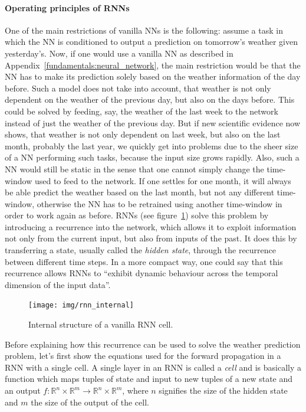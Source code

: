 \paragraph{Operating principles of RNNs}
One of the main restrictions of vanilla NNs is the following: assume a task in which the NN is conditioned to output a prediction on tomorrow's weather given yesterday's. Now, if one would use a vanilla NN as described in Appendix~\ref{fundamentals:neural_network}, the main restriction would be that the NN has to make its prediction solely based on the weather information of the day before. Such a model does not take into account, that weather is not only dependent on the weather of the previous day, but also on the days before. This could be solved by feeding, say, the weather of the last week to the network instead of just the weather of the previous day. But if new scientific evidence now shows, that weather is not only dependent on last week, but also on the last month, probably the last year, we quickly get into problems due to the sheer size of a NN performing such tasks, because the input size grows rapidly. Also, such a NN would still be static in the sense that one cannot simply change the time-window used to feed to the network. If one settles for one month, it will always be able predict the weather based on the last month, but not any different time-window, otherwise the NN has to be retrained using another time-window in order to work again as before. RNNs (see figure~\ref{fundamentals:rnn:internal_structure}) solve this problem by introducing a recurrence into the network, which allows it to exploit information not only from the current input, but also from inputs of the past. It does this by transferring a state, usually called the \emph{hidden state}, through the recurrence between different time steps. In a more compact way, one could say that this recurrence allows RNNs to ``exhibit dynamic behaviour across the temporal dimension of the input data''.

\begin{figure}[h]
	\label{fundamentals:rnn:internal_structure}
	\centering
	\texttt{[image: img/rnn\_internal]}
	\caption{Internal structure of a vanilla RNN cell.\protect\footnotemark}
\end{figure}


Before explaining how this recurrence can be used to solve the weather prediction problem, let's first show the equations used for the forward propagation in a RNN with a single cell. A single layer in an RNN is called a \emph{cell} and is basically a function which maps tuples of state and input to new tuples of a new state and an output $f\colon \mathbb{R}^n \times \mathbb{R}^m \rightarrow \mathbb{R}^n \times \mathbb{R}^m$, where $n$ signifies the size of the hidden state and $m$ the size of the output of the cell.

